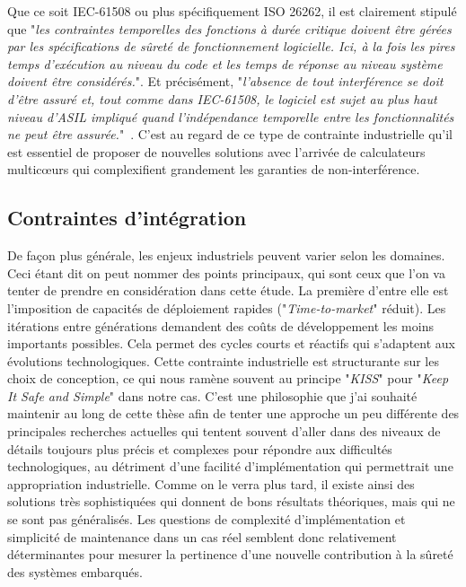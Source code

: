 \documentclass[french, a4paper, 11pt, twoside, pdftex]{StyleThese}
\begin{document}
		Que ce soit IEC-61508 ou plus spécifiquement ISO 26262, il est clairement stipulé que 
		"\textit{les contraintes temporelles des fonctions à durée critique doivent être gérées par les spécifications de sûreté de fonctionnement logicielle. Ici, à la fois les pires temps d'exécution au niveau du code et les temps de réponse au niveau système doivent être considérés.}". Et précisément, "\textit{l'absence de tout interférence se doit d'être assuré et, tout comme dans IEC-61508, le logiciel est sujet au plus haut niveau d'ASIL impliqué quand l'indépendance temporelle entre les fonctionnalités ne peut être assurée.}"~\cite{iso_26262-7_road_2018}. C'est au regard de ce type de contrainte industrielle qu'il est essentiel de proposer de nouvelles solutions avec l'arrivée de calculateurs multicœurs qui complexifient grandement les garanties de non-interférence.
	
	\subsection{Contraintes d'intégration}
			
	De façon plus générale, les enjeux industriels peuvent varier selon les domaines. Ceci étant dit on peut nommer des points principaux, qui sont ceux que l'on va tenter de prendre en considération dans cette étude. La première d'entre elle est l'imposition de capacités de déploiement rapides ("\textit{Time-to-market}" réduit). Les itérations entre générations demandent des coûts de développement les moins importants possibles. Cela permet des cycles courts et réactifs qui s'adaptent aux évolutions technologiques. Cette contrainte industrielle est structurante sur les choix de conception, ce qui nous ramène souvent au principe "\emph{KISS}" pour "\emph{Keep It Safe and Simple}" dans notre cas. C'est une philosophie que j'ai souhaité maintenir au long de cette thèse afin de tenter une approche un peu différente des principales recherches actuelles qui tentent souvent d'aller dans des niveaux de détails toujours plus précis et complexes pour répondre aux difficultés technologiques, au détriment d'une facilité d'implémentation qui permettrait une appropriation industrielle. Comme on le verra plus tard, il existe ainsi des solutions très sophistiquées qui donnent de bons résultats théoriques, mais qui ne se sont pas généralisés. Les questions de complexité d'implémentation et simplicité de maintenance dans un cas réel semblent donc relativement déterminantes pour mesurer la pertinence d'une nouvelle contribution à la sûreté des systèmes embarqués. 
	
\end{document}
